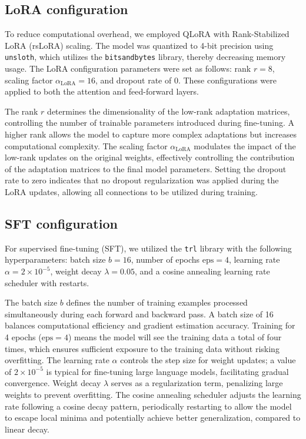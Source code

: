 \documentclass{article}
\newcounter{para}
\begin{document}
\subsection{LoRA configuration}

To reduce computational overhead, we employed QLoRA with Rank-Stabilized LoRA (rsLoRA) scaling. The model was quantized to 4-bit precision using \texttt{unsloth}, which utilizes the \texttt{bitsandbytes} library, thereby decreasing memory usage. The LoRA configuration parameters were set as follows: rank \( r = 8 \), scaling factor \( \alpha_{\text{LoRA}} = 16 \), and dropout rate of 0. These configurations were applied to both the attention and feed-forward layers.

The rank \( r \) determines the dimensionality of the low-rank adaptation matrices, controlling the number of trainable parameters introduced during fine-tuning. A higher rank allows the model to capture more complex adaptations but increases computational complexity. The scaling factor \( \alpha_{\text{LoRA}} \) modulates the impact of the low-rank updates on the original weights, effectively controlling the contribution of the adaptation matrices to the final model parameters. Setting the dropout rate to zero indicates that no dropout regularization was applied during the LoRA updates, allowing all connections to be utilized during training.

\subsection{SFT configuration}

For supervised fine-tuning (SFT), we utilized the \texttt{trl} library with the following hyperparameters: batch size \( b = 16 \), number of epochs \( \text{eps} = 4 \), learning rate \( \alpha = 2 \times 10^{-5} \), weight decay \( \lambda = 0.05 \), and a cosine annealing learning rate scheduler with restarts.

The batch size \( b \) defines the number of training examples processed simultaneously during each forward and backward pass. A batch size of 16 balances computational efficiency and gradient estimation accuracy. Training for 4 epochs (\( \text{eps} = 4 \)) means the model will see the training data a total of four times, which ensures sufficient exposure to the training data without risking overfitting. The learning rate \( \alpha \) controls the step size for weight updates; a value of \( 2 \times 10^{-5} \) is typical for fine-tuning large language models, facilitating gradual convergence. Weight decay \( \lambda \) serves as a regularization term, penalizing large weights to prevent overfitting. The cosine annealing scheduler adjusts the learning rate following a cosine decay pattern, periodically restarting to allow the model to escape local minima and potentially achieve better generalization, compared to linear decay.
\end{document}
